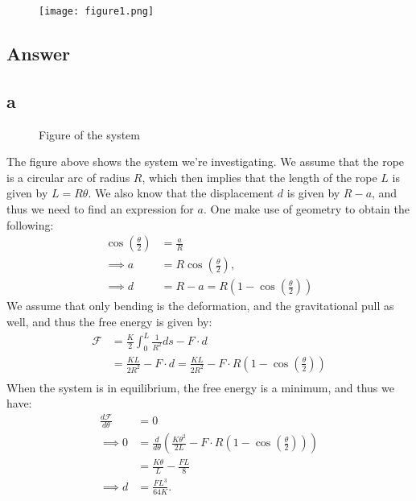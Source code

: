 \documentclass[a4paper]{article}
\begin{document}
\begin{figure}[H]
    \centering
    \texttt{[image: figure1.png]}
\end{figure}

\subsection*{Answer}
\subsection*{a}
\begin{figure}[H]
    \centering
    \caption{Figure of the system}
\end{figure}\noindent
The figure above shows the system we're investigating. We assume that the rope is a circular arc of radius $R$, which then implies that the length of the rope $L$ is given by $L = R\theta$.
We also know that the displacement $d$ is given by $R - a$, and thus we need to find an expression for $a$. One make use of geometry to obtain the following:
\begin{align*}
    \cos\left(\frac{\theta}{2}\right) &= \frac{a}{R}\\
    \implies a &= R\cos\left(\frac{\theta}{2}\right),\\
    \implies d &= R - a = R\left(1 - \cos\left(\frac{\theta}{2}\right)\right)
\end{align*}We assume that only bending is the deformation, and the gravitational pull as well, and thus the free energy is given by:
\begin{align*}
    \mathcal{F} &= \frac{K}{2}\int_0^L\frac{1}{R^2}ds - F\cdot d\\
    &=\frac{KL}{2R^2} - F\cdot d =\frac{KL}{2R^2} - F\cdot R\left(1 - \cos\left(\frac{\theta}{2}\right)\right)\\
\end{align*}When the system is in equilibrium, the free energy is a minimum, and thus we have:
\begin{align*}
    \frac{d\mathcal{F}}{d\theta} &= 0\\
    \implies 0&= \frac{d}{d\theta}\left(\frac{K\theta^2}{2L} - F\cdot R\left(1 - \cos\left(\frac{\theta}{2}\right)\right)\right)\\
    &= \frac{K\theta}{L} - \frac{FL}{8}\\
    \implies d &= \frac{FL^3}{64K}.
\end{align*}
\end{document}
